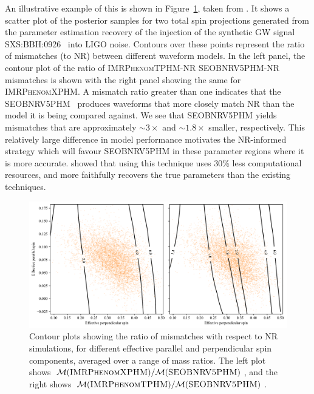 \documentclass{ucdgradtaughtthesis}
\begin{document}
An illustrative example of this is shown in Figure~\ref{fig:projectmotivation}, taken from \cite{Ogpaper}. It shows a scatter plot of the posterior samples for two total spin projections generated from the parameter estimation recovery of the injection of the synthetic GW signal \textsc{SXS:BBH:0926}~\cite{NRsimulation} into LIGO noise. 
Contours over these points represent the ratio of mismatches (to NR) between different waveform models.
In the left panel, the contour plot of the ratio of \textsc{IMRPhenomTPHM}-NR \textsc{SEOBNRV5PHM}-NR mismatches is shown with the right panel showing the same for \textsc{IMRPhenomXPHM}\cite{NRfitMP}.
A mismatch ratio greater than one indicates that the \textsc{SEOBNRV5PHM}~\cite{bestNRfitS} produces waveforms that more closely match NR than the model it is being compared against.
We see that \textsc{SEOBNRV5PHM} yields mismatches that are approximately \( \sim 3\times \) and \( \sim 1.8\times \) smaller, respectively.
This relatively large difference in model performance motivates the NR-informed strategy
which will favour \textsc{SEOBNRV5PHM} in these parameter regions where it is more accurate. 
\cite{Ogpaper} showed that using this technique uses 30\% less computational resources, and more faithfully recovers the true parameters than
the existing techniques.
%

\begin{figure}[H]
    \centering
    \includegraphics[width=\textwidth]{LatexPlots/HoyFigure2.pdf}
    \caption[Motivating the NR Bayesian Method.]{Contour plots showing the ratio of mismatches with respect to NR simulations, for different effective parallel and perpendicular spin components, averaged over a range of mass ratios. 
    The left plot shows \( \mathcal{M}(\textsc{IMRPhenomXPHM}) / \mathcal{M}(\textsc{SEOBNRV5PHM}) \), and the right shows \( \mathcal{M}(\textsc{IMRPhenomTPHM}) / \mathcal{M}(\textsc{SEOBNRV5PHM}) \).}
    \label{fig:projectmotivation}
\end{figure}
\end{document}
